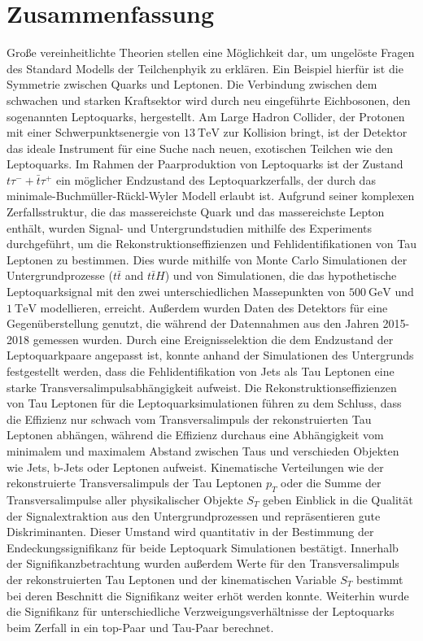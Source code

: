 \chapter*{Zusammenfassung}
Gro{\ss}e vereinheitlichte Theorien stellen eine M\"{o}glichkeit dar, um ungel\"{o}ste Fragen des Standard Modells der Teilchenphyik zu erkl\"{a}ren. Ein Beispiel hierf\"{u}r ist die Symmetrie zwischen Quarks und Leptonen. Die Verbindung zwischen dem schwachen und starken Kraftsektor wird durch neu eingef\"{u}hrte Eichbosonen, den sogenannten Leptoquarks, hergestellt. Am Large Hadron Collider, der Protonen mit einer Schwerpunktsenergie von $\SI{13}{\tera\electronvolt}$ zur Kollision bringt, ist der {\ATLAS} Detektor das ideale Instrument f\"{u}r eine Suche nach neuen, exotischen Teilchen wie den Leptoquarks. Im Rahmen der Paarproduktion von Leptoquarks ist der Zustand $t\tau^{-}+\bar{t}\tau^{+}$ ein m\"{o}glicher Endzustand des Leptoquarkzerfalls, der durch das minimale-Buchm\"{u}ller-R\"{u}ckl-Wyler Modell erlaubt ist. Aufgrund seiner komplexen Zerfallsstruktur, die das massereichste Quark und das massereichste Lepton enth\"{a}lt, wurden Signal- und Untergrundstudien mithilfe des {\ATLAS} Experiments durchgef\"{u}hrt, um die Rekonstruktionseffizienzen und Fehlidentifikationen von Tau Leptonen zu bestimmen.\newline
Dies wurde mithilfe von Monte Carlo Simulationen der Untergrundprozesse ($t\bar{t}$ and $t\bar{t}H$) und von Simulationen, die das hypothetische Leptoquarksignal mit den zwei unterschiedlichen Massepunkten von $\SI{500}{\giga\electronvolt}$ und $\SI{1}{\tera\electronvolt}$ modellieren, erreicht. Au{\ss}erdem wurden Daten des {\ATLAS} Detektors f\"{u}r eine Gegen\"{u}berstellung genutzt, die w\"{a}hrend der Datennahmen aus den Jahren 2015-2018 gemessen wurden. Durch eine Ereignisselektion die dem Endzustand der Leptoquarkpaare angepasst ist, konnte anhand der Simulationen des Untergrunds festgestellt werden, dass die Fehlidentifikation von Jets als Tau Leptonen eine starke Transversalimpulsabh\"{a}ngigkeit aufweist. Die Rekonstruktionseffizienzen von Tau Leptonen f\"{u}r die Leptoquarksimulationen f\"{u}hren zu dem Schluss, dass die Effizienz nur schwach vom Transversalimpuls der rekonstruierten Tau Leptonen abh\"{a}ngen, w\"{a}hrend die Effizienz durchaus eine Abh\"{a}ngigkeit vom minimalem und maximalem Abstand zwischen Taus und verschieden Objekten wie Jets, b-Jets oder Leptonen aufweist.\newline
Kinematische Verteilungen wie der rekonstruierte Transversalimpuls der Tau Leptonen $p_T$ oder die Summe der Transversalimpulse aller physikalischer Objekte $S_T$ geben Einblick in die Qualit\"{a}t der Signalextraktion aus den Untergrundprozessen und repr\"{a}sentieren gute Diskriminanten. Dieser Umstand wird quantitativ in der Bestimmung der Endeckungssignifikanz f\"{u}r beide Leptoquark Simulationen best\"{a}tigt. Innerhalb der Signifikanzbetrachtung wurden au{\ss}erdem Werte f\"{u}r den Transversalimpuls der rekonstruierten Tau Leptonen und der kinematischen Variable $S_T$ bestimmt bei deren Beschnitt die Signifikanz weiter erh\"{o}t werden konnte. Weiterhin wurde die Signifikanz f\"{u}r unterschiedliche Verzweigungsverh\"{a}ltnisse der Leptoquarks beim Zerfall in ein top-Paar und Tau-Paar berechnet. 
